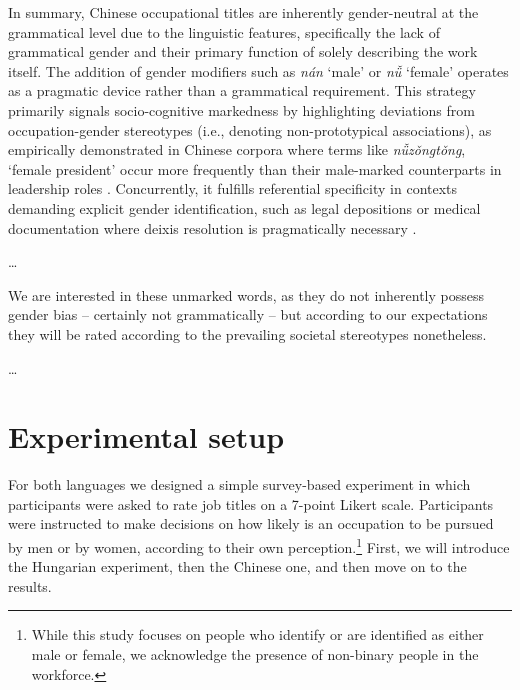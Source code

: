 \documentclass[11pt]{article}
\newcommand{\zh}[1]{\simplifiedchinesefont{#1}\rmfamily}
\begin{document}
In summary, Chinese occupational titles are inherently gender-neutral at the grammatical level due to the linguistic features, specifically the lack of grammatical gender and their primary function of solely describing the work itself. The addition of gender modifiers such as \zh{男} \textit{nán} `male' or \zh{女} \textit{nǚ} `female' operates as a pragmatic device rather than a grammatical requirement. This strategy primarily signals socio-cognitive markedness by highlighting deviations from occupation-gender stereotypes (i.e., denoting non-prototypical associations), as empirically demonstrated in Chinese corpora where terms like \zh{女总统} \textit{nǚzǒngtǒng}, `female president' occur more frequently than their male-marked counterparts in leadership roles \citep{su_2021_occupational,farris_1988_gender}. Concurrently, it fulfills referential specificity in contexts demanding explicit gender identification, such as legal depositions or medical documentation where deixis resolution is pragmatically necessary \citep{hellinger_2003_gender,stahlberg_2011_representation}.



\dots

We are interested in these unmarked words, as they do not inherently possess gender bias -- certainly not grammatically -- but according to our expectations they will be rated according to the prevailing societal stereotypes nonetheless.

\dots




\section{Experimental setup}\label{sec:experiment_setup}

For both languages we designed a simple survey-based experiment in which participants were asked to rate job titles on a 7-point Likert scale.
Participants were instructed to make decisions on how likely is an occupation to be pursued by men or by women, according to their own perception.\footnote{While this study focuses on people who identify or are identified as either male or female, we acknowledge the presence of non-binary people in the workforce.} First, we will introduce the Hungarian experiment, then the Chinese one, and then move on to the results.
\end{document}
